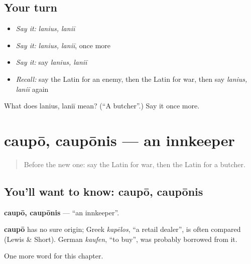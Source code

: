 \subsection*{Your turn}
\begin{itemize}
\raggedright
  \item \emph{Say it:} \emph{lanius, laniī}
  \item \emph{Say it:} \emph{lanius, laniī}, once more
  \item \emph{Say it:} say \emph{lanius, laniī}
  \item \emph{Recall:} say the Latin for an enemy, then the Latin for war, then say \emph{lanius, laniī} again
\end{itemize}

\begin{tcolorbox}[breakable,colback=teal!4,colframe=teal!35!black,title={Before you move on}]
What does lanius, laniī mean? (\textquotedblleft{}A butcher\textquotedblright{}.) Say it once more.
\end{tcolorbox}
\section[caupō, caupōnis]{caupō, caupōnis — an innkeeper}

\label{lesson:LA-C272-caupo}



\begin{quote}
Before the new one: say the Latin for war, then the Latin for a butcher.
\end{quote}

\subsection*{You'll want to know: caupō, caupōnis}
\textbf{caupō, caupōnis} — \textquotedblleft{}an innkeeper\textquotedblright{}.

\begin{cousinweb}
\textbf{caupō} has no sure origin; Greek \emph{kapēlos}, \textquotedblleft{}a retail dealer\textquotedblright{}, is often compared (Lewis \& Short). German \emph{kaufen}, \textquotedblleft{}to buy\textquotedblright{}, was probably borrowed from it.
\end{cousinweb}

\begin{grammarlens}[title={What you've built}]
One more word for this chapter.
\end{grammarlens}

